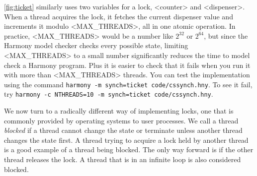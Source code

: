 \documentclass{report}
\begin{document}
\autoref{fig:ticket} similarly uses two variables for a lock,
<{counter}> and <{dispenser}>.  When a thread acquires the
lock, it fetches the current dispenser value and increments it
modulo <{MAX_THREADS}>, all in one atomic operation.
In practice, <{MAX_THREADS}> would
be a number like $2^{32}$ or $2^{64}$, but since the Harmony model checker
checks every possible state, limiting <{MAX_THREADS}>
to a small number
significantly reduces the time to model check a Harmony program.
Plus it is easier to check that it fails when you run it with more than
<{MAX_THREADS}> threads.
You can test the implementation using the command
\texttt{harmony -m synch=ticket code/cssynch.hny}.
To see it fail, try
\texttt{harmony -c NTHREADS=10 -m synch=ticket code/cssynch.hny}.

%

We now turn to a radically different way of implementing locks, one
that is commonly provided by operating systems to user processes.
We call a thread \emph{blocked}
%
if a thread cannot change the state or terminate unless
another thread changes the state first.
A thread trying to acquire a lock held by another thread is a good example
of a thread being blocked.
The only way forward is if the other thread releases the lock.
A thread that is in an infinite loop is also considered blocked.
\end{document}
